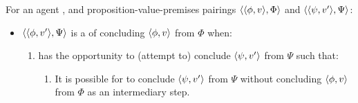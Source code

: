 \begin{note}
  \begin{definition}[A \requP{0}]
    \label{idea:requP}
    For an agent \vAgent{}, and proposition-value-premises pairings \(\langle \langle \phi, v \rangle, \Phi \rangle\) and \(\langle \langle \psi, v' \rangle, \Psi \rangle\):

    \begin{itemize}
    \item
      \(\langle \langle \phi, v' \rangle, \Psi \rangle\) is a \emph{\requP{}} of concluding \(\langle \phi, v \rangle\) from \(\Phi\) when:
      \begin{enumerate}[label=\arabic*., ref=\named{R:\arabic*}]
      \item
        \label{idea:requP:pool}
        \vAgent{} has the opportunity to (attempt to) conclude \(\langle \psi, v' \rangle\) from \(\Psi\) such that:
        \begin{enumerate}[label=\roman*., ref=\named{R:1\roman*}]
        \item
          \label{idea:requP:pool:int}
          It is possible for \vAgent{} to conclude \(\langle \psi, v' \rangle\) from \(\Psi\) without concluding \(\langle \phi, v \rangle\) from \(\Phi\) as an intermediary step.
        \end{enumerate}
      \end{enumerate}


\end{itemize}
\end{definition}
\end{note}
